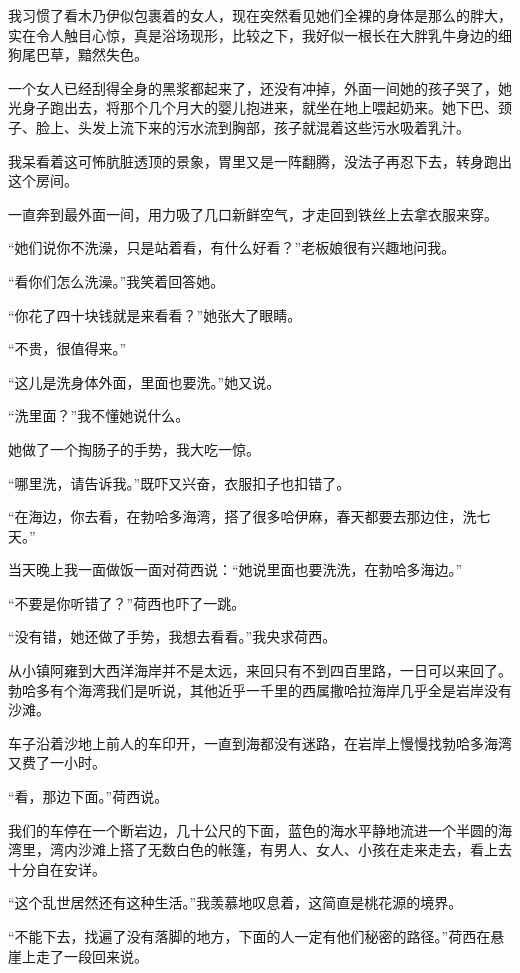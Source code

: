 \par 我习惯了看木乃伊似包裹着的女人，现在突然看见她们全裸的身体是那么的胖大，实在令人触目心惊，真是浴场现形，比较之下，我好似一根长在大胖乳牛身边的细狗尾巴草，黯然失色。
\par 一个女人已经刮得全身的黑浆都起来了，还没有冲掉，外面一间她的孩子哭了，她光身子跑出去，将那个几个月大的婴儿抱进来，就坐在地上喂起奶来。她下巴、颈子、脸上、头发上流下来的污水流到胸部，孩子就混着这些污水吸着乳汁。
\par 我呆看着这可怖肮脏透顶的景象，胃里又是一阵翻腾，没法子再忍下去，转身跑出这个房间。
\par 一直奔到最外面一间，用力吸了几口新鲜空气，才走回到铁丝上去拿衣服来穿。
\par “她们说你不洗澡，只是站着看，有什么好看？”老板娘很有兴趣地问我。
\par “看你们怎么洗澡。”我笑着回答她。
\par “你花了四十块钱就是来看看？”她张大了眼睛。
\par “不贵，很值得来。”
\par “这儿是洗身体外面，里面也要洗。”她又说。
\par “洗里面？”我不懂她说什么。
\par 她做了一个掏肠子的手势，我大吃一惊。
\par “哪里洗，请告诉我。”既吓又兴奋，衣服扣子也扣错了。
\par “在海边，你去看，在勃哈多海湾，搭了很多哈伊麻，春天都要去那边住，洗七天。”
\par 当天晚上我一面做饭一面对荷西说：“她说里面也要洗洗，在勃哈多海边。”
\par “不要是你听错了？”荷西也吓了一跳。
\par “没有错，她还做了手势，我想去看看。”我央求荷西。
\par 从小镇阿雍到大西洋海岸并不是太远，来回只有不到四百里路，一日可以来回了。勃哈多有个海湾我们是听说，其他近乎一千里的西属撒哈拉海岸几乎全是岩岸没有沙滩。
\par 车子沿着沙地上前人的车印开，一直到海都没有迷路，在岩岸上慢慢找勃哈多海湾又费了一小时。
\par “看，那边下面。”荷西说。
\par 我们的车停在一个断岩边，几十公尺的下面，蓝色的海水平静地流进一个半圆的海湾里，湾内沙滩上搭了无数白色的帐篷，有男人、女人、小孩在走来走去，看上去十分自在安详。
\par “这个乱世居然还有这种生活。”我羡慕地叹息着，这简直是桃花源的境界。
\par “不能下去，找遍了没有落脚的地方，下面的人一定有他们秘密的路径。”荷西在悬崖上走了一段回来说。
